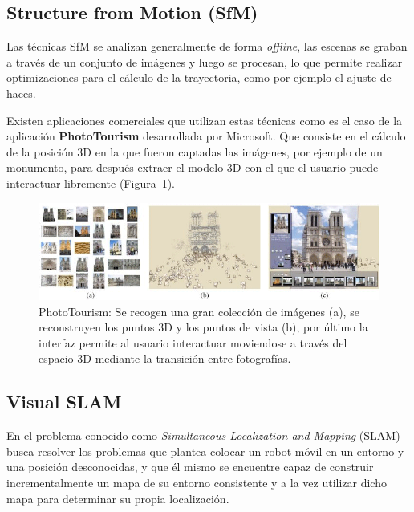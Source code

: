 \subsection{Structure from Motion (SfM)}

Las técnicas SfM se analizan generalmente de forma \textit{offline}, las escenas se graban a través de un conjunto de imágenes y luego se procesan, lo que permite realizar optimizaciones para el cálculo de la trayectoria, como por ejemplo el ajuste de haces.

Existen aplicaciones comerciales que utilizan estas técnicas como es el caso de la aplicación \textbf{PhotoTourism} \parencite{Reference2} desarrollada por Microsoft. Que consiste en el cálculo de la posición 3D en la que fueron captadas las imágenes, por ejemplo de un monumento, para después extraer el modelo 3D con el que el usuario puede interactuar libremente (Figura~\ref{fig:Tourism}).

\begin{figure}[th]
\centering
\includegraphics[scale=0.57]{Figures/phototourism.png}
\decoRule
\caption[PhotoTourism]{PhotoTourism: Se recogen una gran colección de imágenes (a), se reconstruyen los puntos 3D y los puntos de vista (b), por último la interfaz permite al usuario interactuar moviendose a través del espacio 3D mediante la transición entre fotografías.}
\label{fig:Tourism}
\end{figure}

\subsection{Visual SLAM}

En el problema conocido como \textit{Simultaneous Localization and Mapping} (SLAM) busca resolver los problemas que plantea colocar un robot móvil en un entorno y una posición desconocidas, y que él mismo se encuentre capaz de construir incrementalmente un mapa de su entorno consistente y a la vez utilizar dicho mapa para determinar su propia localización.

